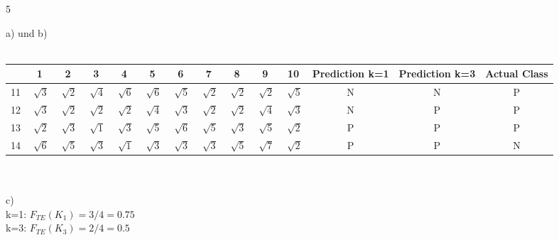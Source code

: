 \documentclass{article}
\begin{document}
\begin{ukon-infie}[29.11.17]{5}
		\begin{exercise}[p=10]{}
		a) und b)\\\\
		\begin{tabular}{|c|c|c|c|c|c|c|c|c|c|c|c|c|c|}
		\hline 
		 & 1 & 2 & 3 & 4 & 5 & 6 & 7 & 8 & 9 & 10 & Prediction k=1 & Prediction k=3 & Actual Class \\ 
		\hline 
		11 & $\sqrt[]{3}$ & $\sqrt[]{2}$ & $\sqrt[]{4}$ & $\sqrt[]{6}$ & $\sqrt[]{6}$ & $\sqrt[]{5}$ & $\sqrt[]{2}$ & $\sqrt[]{2}$ & $\sqrt[]{2}$ & $\sqrt[]{5}$ & N & N & P \\ 
		\hline 
		12 & $\sqrt[]{3}$ & $\sqrt[]{2}$ & $\sqrt[]{2}$ & $\sqrt[]{2}$ & $\sqrt[]{4}$ & $\sqrt[]{3}$ & $\sqrt[]{2}$ & $\sqrt[]{2}$ & $\sqrt[]{4}$ & $\sqrt[]{3}$ & N & P & P \\ 
		\hline 
		13 & $\sqrt[]{2}$ & $\sqrt[]{3}$ & $\sqrt[]{1}$ & $\sqrt[]{3}$ & $\sqrt[]{5}$ & $\sqrt[]{6}$ & $\sqrt[]{5}$ & $\sqrt[]{3}$ & $\sqrt[]{5}$ & $\sqrt[]{2}$ & P & P & P \\ 
		\hline 
		14 & $\sqrt[]{6}$ & $\sqrt[]{5}$ & $\sqrt[]{3}$ & $\sqrt[]{1}$ & $\sqrt[]{3}$ & $\sqrt[]{3}$ & $\sqrt[]{3}$ & $\sqrt[]{5}$ & $\sqrt[]{7}$ & $\sqrt[]{2}$ & P & P & N \\ 
		\hline 
		\end{tabular}\\\\
		c) \\
		k=1: $F_{TE}(K_1) = 3/4 =0.75$\\
		k=3: $F_{TE}(K_3) = 2/4 =0.5$\\
		
		\end{exercise}
		
		\begin{exercise}[p=4]{}
			
		\end{exercise}
		
		


		\begin{exercise}[p=3]{}
		

		\end{exercise}
		
		
\end{ukon-infie}
\end{document}
